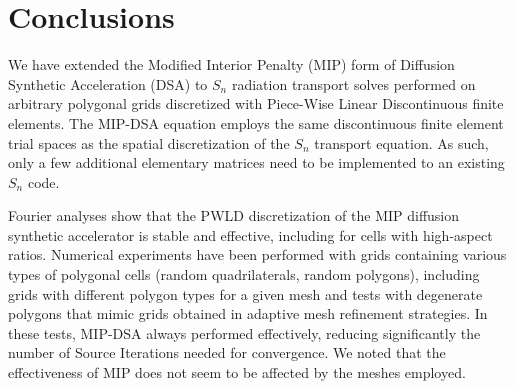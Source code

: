 \documentclass[preprint,10pt]{elsarticle}
\renewcommand{\(}{\left(}
\renewcommand{\)}{\right)}
\renewcommand{\[}{\left[}
\renewcommand{\]}{\right]}
\newcommand{\sn}{\ensuremath{S_n}\xspace}
\begin{document}

\section{Conclusions} \label{sec_conc}
We have extended the Modified Interior Penalty (MIP) form of Diffusion Synthetic Acceleration (DSA) 
to \sn radiation transport solves performed on arbitrary polygonal grids discretized 
with Piece-Wise Linear Discontinuous finite elements. 
The MIP-DSA equation employs the same discontinuous finite element trial spaces as 
the spatial discretization of the \sn transport equation. As such, 
only a few additional elementary matrices need to be implemented to an existing \sn code. 
%
%
%

Fourier analyses show that the PWLD discretization of the MIP diffusion synthetic accelerator 
is stable and effective, including for cells with high-aspect ratios. 
%
Numerical experiments have been performed with grids containing various types of polygonal cells
(random quadrilaterals, random polygons), including
grids with different polygon types for a given mesh and tests with degenerate polygons that mimic
grids obtained in adaptive mesh refinement strategies. In these tests, MIP-DSA always performed effectively,
reducing significantly the number of Source Iterations needed for convergence. 
We noted that the effectiveness of MIP does not seem to be affected by the meshes employed. 
%
\end{document}
